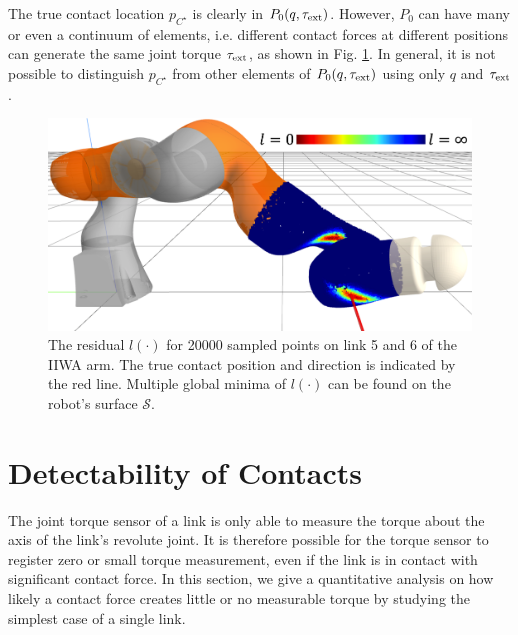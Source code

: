 The true contact location ${p}_{C^\star}$ is clearly in $P_0(q, \tau_{\text{ext}})$. However, $P_0$ can have many or even a continuum of elements, i.e. different contact forces at different positions can generate the same joint torque $\tau_{\text{ext}}$, as shown in Fig. \ref{fig:multiple_local_minima}. In general, it is not possible to distinguish ${p}_{C^\star}$ from other elements of $P_0(q, \tau_{\text{ext}})$ using only $q$ and $\tau_{\text{ext}}$.

\begin{figure}[h]
\centering
\includegraphics[width=0.85\linewidth]{figures/05_force_from_torque/multiple_local_minima.png}
\caption{The residual $l(\cdot)$ for 20000 sampled points on link 5 and 6 of the IIWA arm. The true contact position and direction is indicated by the red line. Multiple global minima of $l(\cdot)$ can be found on the robot's surface $\mathcal{S}$.}
\label{fig:multiple_local_minima}
\end{figure}

\section{Detectability of Contacts \label{sec:observability}}
The joint torque sensor of a link is only able to measure the torque about the axis of the link's revolute joint. It is therefore possible for the torque sensor to register zero or small torque measurement, even if the link is in contact with significant contact force. In this section, we give a quantitative analysis on how likely a contact force creates little or no measurable torque by studying the simplest case of a single link.

